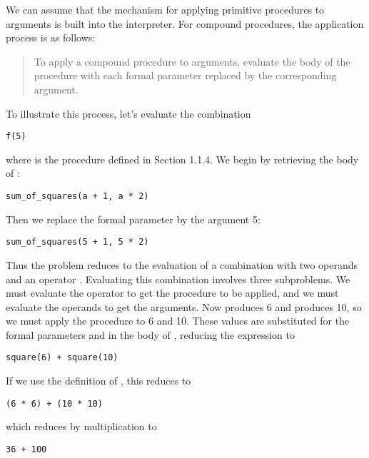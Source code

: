 We can assume that the mechanism for applying primitive procedures to arguments is built into the interpreter. For compound procedures, the application process is as follows:

\begin{quote}
To apply a compound procedure to arguments, evaluate the body of the procedure with each formal parameter replaced by the corresponding argument.
\end{quote}

To illustrate this process, let's evaluate the combination

\begin{lstlisting}
f(5)
\end{lstlisting}

where  is the procedure defined in Section 1.1.4. We begin by retrieving the body of :

\begin{lstlisting}
sum_of_squares(a + 1, a * 2)
\end{lstlisting}

Then we replace the formal parameter  by the argument 5:

\begin{lstlisting}
sum_of_squares(5 + 1, 5 * 2)
\end{lstlisting}

Thus the problem reduces to the evaluation of a combination with two operands and an operator . Evaluating this combination involves three subproblems. We must evaluate the operator to get the procedure to be applied, and we must evaluate the operands to get the arguments. Now  produces 6 and  produces 10, so we must apply the  procedure to 6 and 10. These values are substituted for the formal parameters  and  in the body of , reducing the expression to

\begin{lstlisting}
square(6) + square(10)
\end{lstlisting}

If we use the definition of , this reduces to

\begin{lstlisting}
(6 * 6) + (10 * 10)
\end{lstlisting}

which reduces by multiplication to

\begin{lstlisting}
36 + 100
\end{lstlisting}

